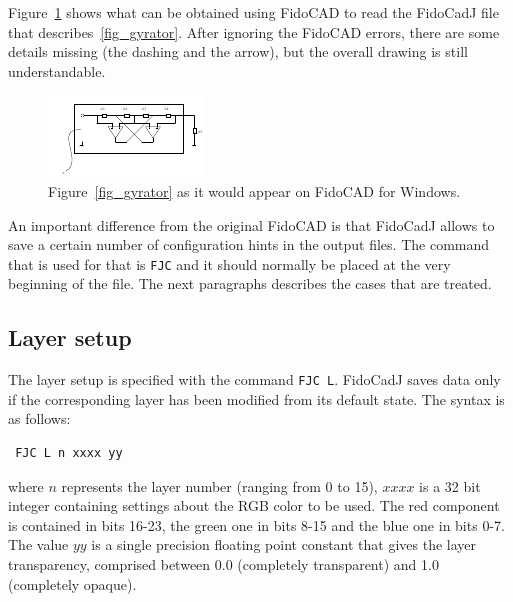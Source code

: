 \documentclass[10pt,a4paper,twoside]{scrreprt}
\begin{document}
Figure~\ref{fig_gyrator_n} shows what can be obtained using FidoCAD to read the FidoCadJ file that describes~\ref{fig_gyrator}. After ignoring the FidoCAD errors, there are some details missing (the dashing and the arrow), but the overall drawing is still understandable.

\begin{figure}
\includegraphics[width=\textwidth]{gyrator_n}
\caption{Figure~\ref{fig_gyrator} as it would appear on FidoCAD for Windows.}
\label{fig_gyrator_n}
\end{figure}

An important difference from the original FidoCAD is that FidoCadJ allows to save a certain number of configuration hints in the output files. The command that is used for that is \lstinline!FJC! and it should normally be placed at the very beginning of the file. The next paragraphs describes the cases that are treated.

 \subsection{Layer setup}
 The layer setup is specified with the command \lstinline!FJC L!. FidoCadJ saves data only if the corresponding layer has been modified from its default state. The syntax is as follows:
 \begin{lstlisting}
 FJC L n xxxx yy
\end{lstlisting}
where $n$ represents the layer number (ranging from 0 to 15), $xxxx$ is a 32 bit integer containing settings about the RGB color to be used. The red component is contained in bits 16-23, the green one in bits 8-15 and the blue one in bits 0-7.
The value $yy$ is a single precision floating point constant that gives the layer transparency, comprised between 0.0 (completely transparent) and 1.0 (completely opaque).
\end{document}
